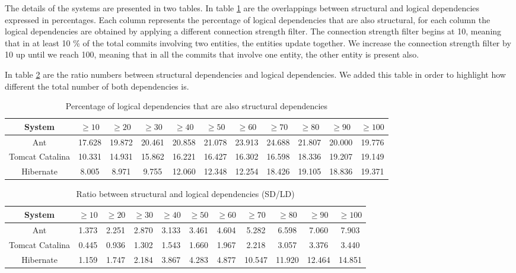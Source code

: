 \documentclass[runningheads]{comsis2}
\begin{document}
The details of the systems are presented in two tables.  In table \ref{tab:overlap} are the overlappings between structural and logical dependencies expressed in percentages. Each column represents the percentage of logical dependencies that are also structural, for each column the logical dependencies are obtained by applying a different connection strength filter. The connection strength filter begins at 10, meaning that in at least 10 \% of the total commits involving two entities, the entities update together. We increase the connection strength filter by 10 up until we reach 100, meaning that in all the commits that involve one entity, the other entity is present also.


In table \ref{tab:ratio_sd_ld} are the ratio numbers between structural dependencies and logical dependencies. We added this table in order to highlight how different the total number of both dependencies is.


\begin{table}[!h]
\setlength\tabcolsep{3pt}
\caption{Percentage of logical dependencies that are also structural dependencies}
\label{tab:overlap}
\centering
\begin{tabular}{|c|cccccccccc|}
\hline
System &	$\geq10$	&	$\geq20$		&	$\geq30$		&	$\geq40$		&	$\geq50$		&	$\geq60$		&	$\geq70$		&	$\geq80$		&	$\geq90$		&	$\geq100$ \\
\hline
Ant	&	17.628	&	19.872	&	20.461	&	20.858	&	21.078	&	23.913	&	24.688	&	21.807	&	20.000	&	19.776	\\
Tomcat Catalina  	&	10.331	&	14.931	&	15.862	&	16.221	&	16.427	&	16.302	&	16.598	&	18.336	&	19.207	&	19.149	\\
Hibernate	&	8.005	&	8.971	&	9.755	&	12.060	&	12.348	&	12.254	&	18.426	&	19.105	&	18.836	&	19.371	\\
\hline
\end{tabular}
\end{table}



\begin{table}[!h]
\setlength\tabcolsep{3.5pt}
\caption{Ratio between structural and logical dependencies (SD/LD)}
\label{tab:ratio_sd_ld}
\centering
\begin{tabular}{|c|cccccccccc|}
\hline
System &	$\geq10$	&	$\geq20$		&	$\geq30$		&	$\geq40$		&	$\geq50$		&	$\geq60$		&	$\geq70$		&	$\geq80$		&	$\geq90$		&	$\geq100$ \\

\hline
Ant	&	1.373	&	2.251	&	2.870	&	3.133	&	3.461	&	4.604	&	5.282	&	6.598	&	7.060	&	7.903	\\
Tomcat Catalina	&	0.445	&	0.936	&	1.302	&	1.543	&	1.660	&	1.967	&	2.218	&	3.057	&	3.376	&	3.440	\\
Hibernate	&	1.159	&	1.747	&	2.184	&	3.867	&	4.283	&	4.877	&	10.547	&	11.920	&	12.464	&	14.851	\\

\hline
\end{tabular}
\end{table}
\end{document}

